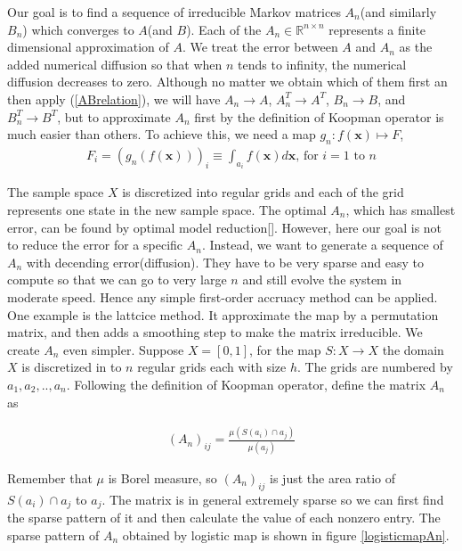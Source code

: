 \documentclass{article}
\begin{document}
Our goal is to find a sequence of irreducible Markov matrices $A_n$(and similarly $B_n$) which converges to $A$(and $B$). Each of the $A_n \in \mathbb{R}^{n \times n} $ represents a finite dimensional approximation of $A$. We treat the error between $A$ and $A_n$ as the added numerical diffusion so that when $n$ tends to infinity, the numerical diffusion decreases to zero. Although no matter we obtain which of them first an then apply (\ref{ABrelation}), we will have $A_n \rightarrow A$, $A_n^T \rightarrow A^T$, $B_n \rightarrow B$, and $B_n^T\rightarrow B^T$, but to approximate $A_n$ first by the definition of Koopman operator is much easier than others. To achieve this, we need a map $g_n: f(\mathbf{x}) \mapsto F $,
\begin{eqnarray}
  F_i = (g_n(f(\mathbf{x})))_i \equiv \int_{a_i} f(\mathbf{x}) d\mathbf{x}  \mbox{, for }i = 1 \mbox{ to } n
\end{eqnarray}

The sample space $X$ is discretized into regular grids and each of the grid represents one state in the new sample space. The optimal $A_n$, which has smallest error, can be found by optimal model reduction[]. However, here our goal is not to reduce the error for a specific $A_n$. Instead, we want to generate a sequence of $A_n$ with decending error(diffusion). They have to be very sparse and easy to compute so that we can go to very large $n$ and still evolve the system in moderate speed. Hence any simple first-order accruacy method can be applied. One example is the lattcice method. It approximate the map by a permutation matrix, and then adds a smoothing step to make the matrix irreducible. We create $A_n$ even simpler. Suppose $X = [0,1]$, for the map $S: X \rightarrow X$ the domain $X$ is discretized in to $n$ regular grids each with size $h$. The grids are numbered by $a_1,a_2,.., a_n$. Following the definition of Koopman operator, define the matrix $A_n$ as


 \begin{eqnarray}
 \label{Anij}
(A_n)_{ij}= \frac{\mu(S(a_i)\cap a_j)}{\mu(a_j)} 
 \end{eqnarray}

Remember that $\mu$ is Borel measure, so $(A_n)_{ij}$ is just the area ratio of $S(a_i)\cap a_j$ to $a_j$. The matrix is in general extremely sparse so we can first find the sparse pattern of it and then calculate the value of each nonzero entry. The sparse pattern of $A_n$ obtained by logistic map is shown in figure \ref{logisticmapAn}. 
\end{document}
